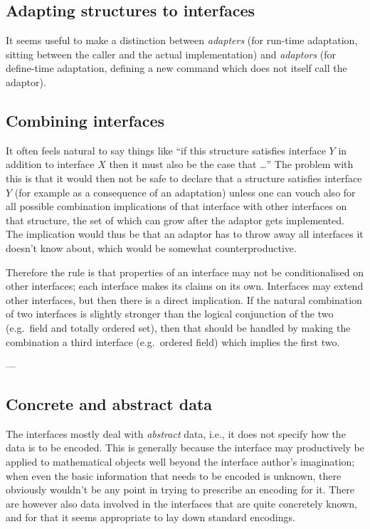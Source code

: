 \documentclass{mtmtcl}
\theoremstyle{plain}
\theoremstyle{remark}
\begin{document}
\subsection{Adapting structures to interfaces}

It seems useful to make a distinction between \emph{adapters} (for 
run-time adaptation, sitting between the caller and the actual 
implementation) and \emph{adaptors} (for define-time adaptation, 
defining a new command which does not itself call the adaptor).


\subsection{Combining interfaces}

It often feels natural to say things like ``if this structure 
satisfies interface $Y$ in addition to interface $X$ then it must 
also be the case that \dots'' The problem with this is that it would 
then not be safe to declare that a structure satisfies interface $Y$ 
(for example as a consequence of an adaptation) unless one can vouch 
also for all possible combination implications of that interface 
with other interfaces on that structure, the set of which can grow 
after the adaptor gets implemented. The implication would thus be 
that an adaptor has to throw away all interfaces it doesn't know 
about, which would be somewhat counterproductive.

Therefore the rule is that properties of an interface may not be 
conditionalised on other interfaces; each interface makes its claims 
on its own. Interfaces may extend other interfaces, but then there is 
a direct implication. If the natural combination of two interfaces is 
slightly stronger than the logical conjunction of the two (e.g.~field 
and totally ordered set), then that should be handled by making the 
combination a third interface (e.g.~ordered field) which implies the 
first two.


---


\subsection{Concrete and abstract data}

The interfaces mostly deal with \emph{abstract} data, i.e., it does 
not specify how the data is to be encoded. This is generally because 
the interface may productively be applied to mathematical objects 
well beyond the interface author's imagination; when even the 
basic information that needs to be encoded is unknown, there 
obviously wouldn't be any point in trying to prescribe an encoding 
for it. There are however also data involved in the interfaces that 
are quite concretely known, and for that it seems appropriate to lay 
down standard encodings.
\end{document}
